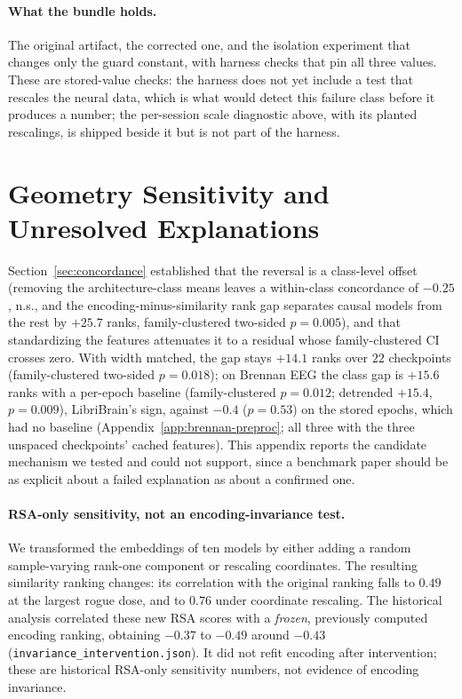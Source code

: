 \documentclass{article}
\begin{document}
\paragraph{What the bundle holds.} The original artifact, the corrected one, and the isolation
experiment that changes only the guard constant, with harness checks that pin all three values.
These are stored-value checks: the harness does not yet include a test that rescales the neural
data, which is what would detect this failure class before it produces a number; the per-session
scale diagnostic above, with its planted rescalings, is shipped beside it but is not part of the harness.

\section{Geometry Sensitivity and Unresolved Explanations}\label{app:mechanism}

Section~\ref{sec:concordance} established that the reversal is a class-level offset (removing the
architecture-class means leaves a within-class concordance of $-0.25$, n.s., and the
encoding-minus-similarity rank gap separates causal models from the rest by $+25.7$ ranks,
family-clustered two-sided $p = 0.005$), and that standardizing the features attenuates it to a residual
whose family-clustered CI crosses zero. With width matched, the gap stays $+14.1$ ranks over $22$
checkpoints (family-clustered two-sided $p=0.018$); on Brennan EEG the class gap is $+15.6$ ranks
with a per-epoch baseline (family-clustered $p=0.012$; detrended $+15.4$, $p=0.009$), LibriBrain's sign,
against $-0.4$ ($p=0.53$) on the stored epochs, which had no baseline (Appendix~\ref{app:brennan-preproc};
all three with the three unspaced checkpoints' cached features). This appendix reports the candidate mechanism we tested and
could not support, since a benchmark paper should be as explicit about a failed explanation as
about a confirmed one.

\paragraph{RSA-only sensitivity, not an encoding-invariance test.}
We transformed the embeddings of ten models by either adding a random sample-varying rank-one
component or rescaling coordinates. The resulting similarity ranking changes: its correlation
with the original ranking falls to $0.49$ at the largest rogue dose, and to $0.76$ under
coordinate rescaling. The historical analysis correlated these new RSA scores with a
\emph{frozen}, previously computed encoding ranking, obtaining $-0.37$ to $-0.49$ around
$-0.43$ (\texttt{invariance\_intervention.json}). It did not refit encoding after intervention;
these are historical RSA-only sensitivity numbers, not evidence of encoding invariance.
\end{document}
